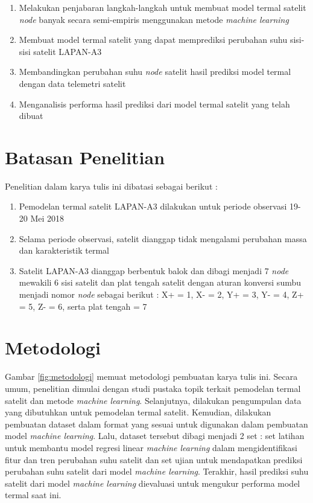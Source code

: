 \begin{enumerate}
\item Melakukan penjabaran langkah-langkah untuk membuat model termal satelit \textit{node} banyak secara semi-empiris menggunakan metode \textit{machine learning}
\item Membuat model termal satelit yang dapat memprediksi perubahan suhu sisi-sisi satelit LAPAN-A3
\item Membandingkan perubahan suhu \textit{node} satelit hasil prediksi model termal dengan data telemetri satelit
\item Menganalisis performa hasil prediksi dari model termal satelit yang telah dibuat
\end{enumerate}

\section{Batasan Penelitian}

Penelitian dalam karya tulis ini dibatasi sebagai berikut :

\begin{enumerate}
\item Pemodelan termal satelit LAPAN-A3 dilakukan untuk periode observasi 19-20 Mei 2018
\item Selama periode observasi, satelit dianggap tidak mengalami perubahan massa dan karakteristik termal
\item Satelit LAPAN-A3 dianggap berbentuk balok dan dibagi menjadi 7
	\textit{node} mewakili 6 sisi satelit dan plat tengah satelit dengan aturan
		konversi sumbu menjadi nomor \textit{node} sebagai berikut : X+ = 1, X- =
		2, Y+ = 3, Y- = 4, Z+ = 5, Z- = 6, serta plat tengah = 7
\end{enumerate}

\section{Metodologi}

Gambar \ref{fig:metodologi} memuat metodologi pembuatan karya tulis ini. Secara
umum, penelitian dimulai dengan studi pustaka topik terkait pemodelan termal
satelit dan metode \textit{machine learning}. Selanjutnya, dilakukan
pengumpulan data yang dibutuhkan untuk pemodelan termal satelit. Kemudian,
dilakukan pembuatan dataset dalam format yang sesuai untuk digunakan dalam
pembuatan model \textit{machine learning}. Lalu, dataset tersebut dibagi
menjadi 2 set : set latihan untuk membantu model regresi linear \textit{machine
learning} dalam mengidentifikasi fitur dan tren perubahan suhu satelit dan set
ujian untuk mendapatkan prediksi perubahan suhu satelit dari model
\textit{machine learning}. Terakhir, hasil prediksi suhu satelit dari model
\textit{machine learning} dievaluasi untuk mengukur performa model termal saat ini.

